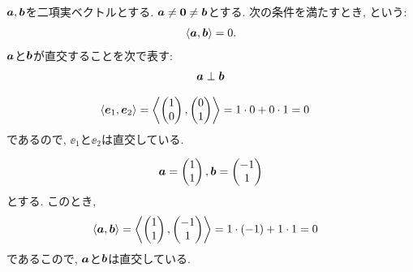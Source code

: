 \begin{definition}
  $\boldsymbol{a},\boldsymbol{b}$を二項実ベクトルとする.
  $\boldsymbol{a}\neq\boldsymbol{0}\neq \boldsymbol{b}$とする.
  次の条件を満たすとき,
  \addindex{$\aaa\perp\bbb$}%
 という:
  \begin{align*}
    \braket{\boldsymbol{a},\boldsymbol{b}}=0.
  \end{align*}
  $\boldsymbol{a}$と$\boldsymbol{b}$が直交することを次で表す:
  \begin{align*}
    \boldsymbol{a}\perp\boldsymbol{b}
  \end{align*}
\end{definition}
\begin{example}
  \label{ex:std:orthoeachother}
  \begin{align*}
    \Braket{\boldsymbol{e}_1,\boldsymbol{e}_2}&=\Braket{\begin{pmatrix}1\\0\end{pmatrix},\begin{pmatrix}0\\1\end{pmatrix}}=1\cdot 0+0\cdot 1=0
  \end{align*}
  であるので, $\ee_1$と$\ee_2$は直交している.
\end{example}
\begin{example}
  \label{ex:nonstd:orth}
  \begin{align*}
    \boldsymbol{a}=
    \begin{pmatrix}
      1\\1
    \end{pmatrix},
    \boldsymbol{b}=
    \begin{pmatrix}
      -1\\1
    \end{pmatrix}
  \end{align*}
  とする.
  このとき,
  \begin{align*}
    \Braket{\boldsymbol{a},\boldsymbol{b}}&=\Braket{\begin{pmatrix}1\\1\end{pmatrix},\begin{pmatrix}-1\\1\end{pmatrix}}=1\cdot(-1)+1\cdot 1=0
  \end{align*}
  であるこので, $\boldsymbol{a}$と$\boldsymbol{b}$は直交している.
\end{example}
